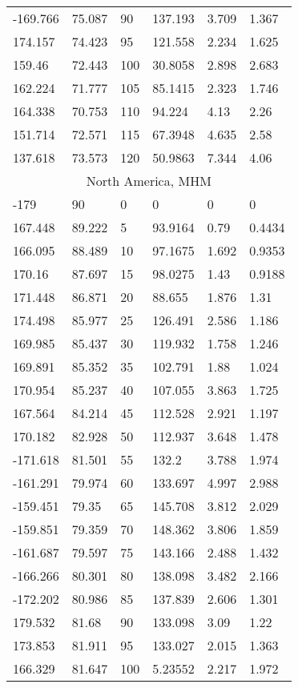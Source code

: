 \begin{longtable}[c]{@{}llllll@{}}
-169.766 & 75.087 & 90 & 137.193 & 3.709 & 1.367 \\
174.157 & 74.423 & 95 & 121.558 & 2.234 & 1.625 \\
159.46 & 72.443 & 100 & 30.8058 & 2.898 & 2.683 \\
162.224 & 71.777 & 105 & 85.1415 & 2.323 & 1.746 \\
164.338 & 70.753 & 110 & 94.224 & 4.13 & 2.26 \\
151.714 & 72.571 & 115 & 67.3948 & 4.635 & 2.58 \\
137.618 & 73.573 & 120 & 50.9863 & 7.344 & 4.06 \\
\multicolumn{6}{c}{North America, MHM} \\
-179 & 90 & 0 & 0 & 0 & 0 \\
167.448 & 89.222 & 5 & 93.9164 & 0.79 & 0.4434 \\
166.095 & 88.489 & 10 & 97.1675 & 1.692 & 0.9353 \\
170.16 & 87.697 & 15 & 98.0275 & 1.43 & 0.9188 \\
171.448 & 86.871 & 20 & 88.655 & 1.876 & 1.31 \\
174.498 & 85.977 & 25 & 126.491 & 2.586 & 1.186 \\
169.985 & 85.437 & 30 & 119.932 & 1.758 & 1.246 \\
169.891 & 85.352 & 35 & 102.791 & 1.88 & 1.024 \\
170.954 & 85.237 & 40 & 107.055 & 3.863 & 1.725 \\
167.564 & 84.214 & 45 & 112.528 & 2.921 & 1.197 \\
170.182 & 82.928 & 50 & 112.937 & 3.648 & 1.478 \\
-171.618 & 81.501 & 55 & 132.2 & 3.788 & 1.974 \\
-161.291 & 79.974 & 60 & 133.697 & 4.997 & 2.988 \\
-159.451 & 79.35 & 65 & 145.708 & 3.812 & 2.029 \\
-159.851 & 79.359 & 70 & 148.362 & 3.806 & 1.859 \\
-161.687 & 79.597 & 75 & 143.166 & 2.488 & 1.432 \\
-166.266 & 80.301 & 80 & 138.098 & 3.482 & 2.166 \\
-172.202 & 80.986 & 85 & 137.839 & 2.606 & 1.301 \\
179.532 & 81.68 & 90 & 133.098 & 3.09 & 1.22 \\
173.853 & 81.911 & 95 & 133.027 & 2.015 & 1.363 \\
166.329 & 81.647 & 100 & 5.23552 & 2.217 & 1.972 \\

\end{longtable}
